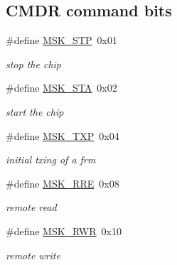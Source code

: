 \subsection*{C\+M\+DR command bits}
\begin{DoxyCompactItemize}
\item 
\mbox{\label{group__gumstix__dp8390_ga60e9cbe5933b3705679a4b13fbdc8859}} 
\#define \mbox{\hyperlink{group__gumstix__dp8390_ga60e9cbe5933b3705679a4b13fbdc8859}{M\+S\+K\+\_\+\+S\+TP}}~0x01
\begin{DoxyCompactList}\small\item\em stop the chip \end{DoxyCompactList}\item 
\mbox{\label{group__gumstix__dp8390_ga3d7615e7106f71b7d29790a37bd1bc17}} 
\#define \mbox{\hyperlink{group__gumstix__dp8390_ga3d7615e7106f71b7d29790a37bd1bc17}{M\+S\+K\+\_\+\+S\+TA}}~0x02
\begin{DoxyCompactList}\small\item\em start the chip \end{DoxyCompactList}\item 
\mbox{\label{group__gumstix__dp8390_gad896b1ce677c40696fa18e84b5afc179}} 
\#define \mbox{\hyperlink{group__gumstix__dp8390_gad896b1ce677c40696fa18e84b5afc179}{M\+S\+K\+\_\+\+T\+XP}}~0x04
\begin{DoxyCompactList}\small\item\em initial txing of a frm \end{DoxyCompactList}\item 
\mbox{\label{group__gumstix__dp8390_ga5d531c00ef0b1585d903e5257a9a0124}} 
\#define \mbox{\hyperlink{group__gumstix__dp8390_ga5d531c00ef0b1585d903e5257a9a0124}{M\+S\+K\+\_\+\+R\+RE}}~0x08
\begin{DoxyCompactList}\small\item\em remote read \end{DoxyCompactList}\item 
\mbox{\label{group__gumstix__dp8390_ga8e7bde7d0e4dc0fdad67e7d95d023cec}} 
\#define \mbox{\hyperlink{group__gumstix__dp8390_ga8e7bde7d0e4dc0fdad67e7d95d023cec}{M\+S\+K\+\_\+\+R\+WR}}~0x10
\begin{DoxyCompactList}\small\item\em remote write \end{DoxyCompactList}\item 

\end{DoxyCompactItemize}
